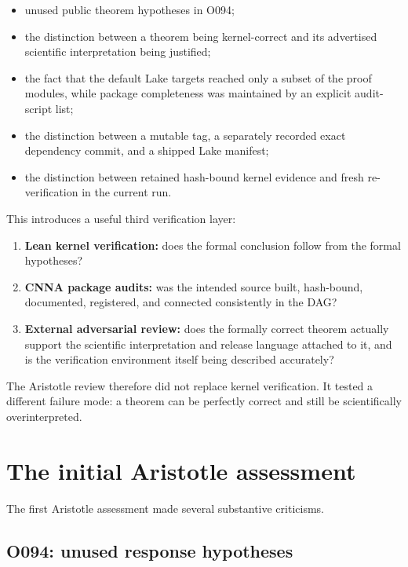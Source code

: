 \documentclass[11pt,a4paper]{article}
\begin{document}
\begin{itemize}
  \item unused public theorem hypotheses in O094;
  \item the distinction between a theorem being kernel-correct and its advertised scientific interpretation being justified;
  \item the fact that the default Lake targets reached only a subset of the proof modules, while package completeness was maintained by an explicit audit-script list;
  \item the distinction between a mutable tag, a separately recorded exact dependency commit, and a shipped Lake manifest;
  \item the distinction between retained hash-bound kernel evidence and fresh re-verification in the current run.
\end{itemize}

This introduces a useful third verification layer:

\begin{enumerate}
  \item \textbf{Lean kernel verification:} does the formal conclusion follow from the formal hypotheses?
  \item \textbf{CNNA package audits:} was the intended source built, hash-bound, documented, registered, and connected consistently in the DAG?
  \item \textbf{External adversarial review:} does the formally correct theorem actually support the scientific interpretation and release language attached to it, and is the verification environment itself being described accurately?
\end{enumerate}

The Aristotle review therefore did not replace kernel verification. It tested a different failure mode: a theorem can be perfectly correct and still be scientifically overinterpreted.

\section{The initial Aristotle assessment}

The first Aristotle assessment made several substantive criticisms.

\subsection{O094: unused response hypotheses}
\end{document}
